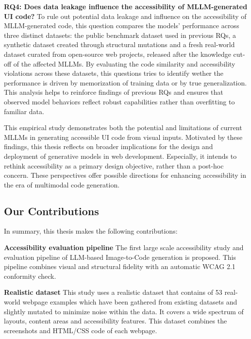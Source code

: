 \textbf{RQ4: Does data leakage influence the accessibility of MLLM-generated UI code?}
To rule out potential data leakage and influence on the accessibility 
of MLLM-generated code, this question compares the models' performance across
three distinct datasets: the public benchmark dataset used in previous 
RQs, a synthetic dataset created through structural mutations and 
a fresh real-world dataset curated from open-source web projects, 
released after the knowledge cut-off of the affected MLLMs. By 
evaluating the code similarity and accessibility violations across
these datasets, this questions tries to identify wether the 
performance is driven by memorization of training data or by 
true generalization. This analysis helps to reinforce findings 
of previous RQs and ensures that observed model behaviors reflect
robust capabilities rather than overfitting to familiar data.\newline

This empirical study demonstrates both the potential and 
limitations of current MLLMs in generating accessible UI code 
from visual inputs. 
Motivated by these findings, this thesis reflects on broader implications
for the design and deployment of generative models in web development. Especially, it 
intends to rethink accessibility as a primary design objective, rather than a 
post-hoc concern. These perspectives offer possible directions for enhancing accessibility in the era of multimodal code generation.



\subsection{Our Contributions}
In summary, this thesis makes the following contributions:

\textbf{Accessibility evaluation pipeline}
The first large scale accessibility study and evaluation pipeline of LLM-based
Image-to-Code generation is proposed. This pipeline combines visual and structural 
fidelity with an automatic WCAG 2.1 conformity check.\newline

\textbf{Realistic dataset}
This study uses a realistic dataset that contains of 53 real-world webpage 
examples which have been gathered from existing datasets and slightly mutated to
minimize noise within the data. It covers a wide spectrum of layouts, content 
areas and accessibility features. This dataset combines the screenshots 
and HTML/CSS code of each webpage.\newline

